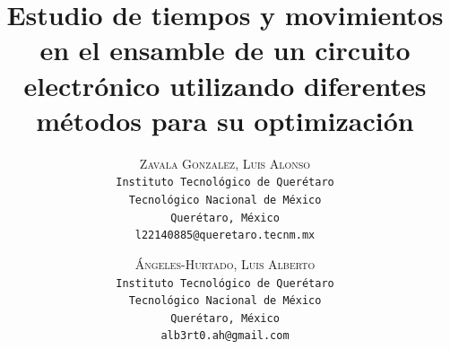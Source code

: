     \lfoot{ \thepage}
    
    \setlength{\droptitle}{-5\baselineskip} %
    \title{\textbf{Estudio de tiempos y movimientos en el ensamble de un circuito electrónico utilizando diferentes métodos para su optimización }} %
    
     \author{ 
     \textsc{Zavala Gonzalez, Luis Alonso}\\ 
     \texttt{ Instituto Tecnológico de Querétaro } \\ 
     \texttt{ Tecnológico Nacional de México } \\ 
     \texttt{Querétaro, México}\\ 
     \texttt{l22140885@queretaro.tecnm.mx} 
     \and 
     \textsc{Ángeles-Hurtado, Luis Alberto}\\ 
     \texttt{ Instituto Tecnológico de Querétaro } \\ 
     \texttt{ Tecnológico Nacional de México } \\ 
     \texttt{Querétaro, México}\\ 
     \texttt{alb3rt0.ah@gmail.com} 
    }
    
    
    
    
